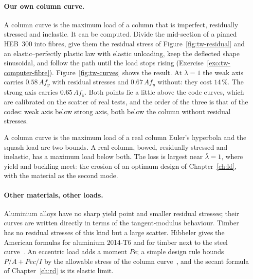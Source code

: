 \paragraph{Our own column curve.}
A column curve is the maximum load of a column that is imperfect, residually stressed and inelastic. It
can be computed. Divide the mid-section of a pinned HEB~300 into fibres, give them the residual stress of
Figure~\ref{fig:tw-residual} and an elastic--perfectly plastic law with elastic unloading, keep the deflected
shape sinusoidal, and follow the path until the load stops rising (Exercise~\ref{exo:tw-computer-fibre}).
Figure~\ref{fig:tw-curves} shows the result. At $\bar\lambda = 1$ the weak axis carries $0.58\,Af_y$ with residual
stresses and $0.67\,Af_y$ without: they cost $14\,\%$. The strong axis carries $0.65\,Af_y$. Both points lie
a little above the code curves, which are calibrated on the scatter of real tests, and the order of the
three is that of the codes: weak axis below strong axis, both below the column without residual stresses.

\begin{gbox}{A column curve is the maximum load of a real column}\label{sec:tw-curvebox}
%
Euler's hyperbola and the squash load are two bounds. A real column, bowed, residually stressed and
inelastic, has a maximum load below both. The loss is largest near $\bar\lambda = 1$, where yield and buckling
meet: the erosion of an optimum design of Chapter~\ref{ch:ld}, with the material as the second mode.
\end{gbox}

\paragraph{Other materials, other loads.}
Aluminium alloys have no sharp yield point and smaller residual stresses; their curves are written
directly in terms of the tangent-modulus behaviour. Timber has no residual stresses of this kind but a
large scatter. Hibbeler gives the American formulas for aluminium 2014-T6 and for timber next to the steel
curve~\cite[Eqs.~(13--24)--(13--29)]{tw-hibbeler2014}. An eccentric load adds a moment $Pe$; a simple design
rule bounds $P/A + Pec/I$ by the allowable stress of the column curve~\cite[Section~13.7]{tw-hibbeler2014}, and
the secant formula of Chapter~\ref{ch:rd} is its elastic limit.

